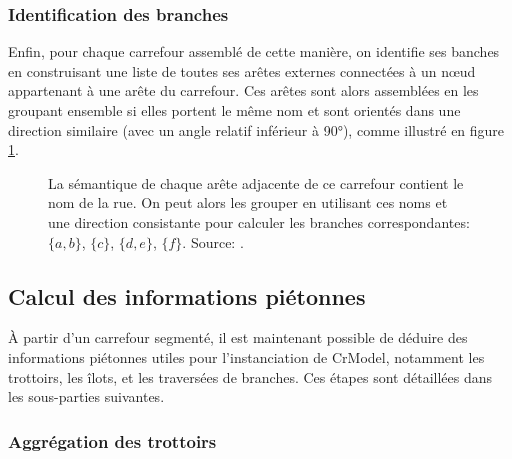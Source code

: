 \subsubsection{Identification des branches}

\newpar{}

Enfin, pour chaque carrefour assemblé de cette manière, on identifie ses banches en construisant une liste de toutes ses arêtes externes connectées à un nœud appartenant à une arête du carrefour. Ces arêtes sont alors assemblées en les groupant ensemble si elles portent le même nom et sont orientés dans une direction similaire (avec un angle relatif inférieur à 90°), comme illustré en figure \ref{fig:modelisation_mergeBranches}.

\begin{figure}
    \centering
    \caption{La sémantique de chaque arête adjacente de ce carrefour contient le nom de la rue. On peut alors les grouper en utilisant ces noms et une direction consistante pour calculer les branches correspondantes: $\{a, b\}$, $\{c\}$, $\{d, e\}$, $\{f\}$. Source: \cite{Favreau2022}.}
    \label{fig:modelisation_mergeBranches}
\end{figure}

\subsection{Calcul des informations piétonnes}

\label{sec:modelisation_calcul_info_pietonnes}

À partir d'un carrefour segmenté, il est maintenant possible de déduire des informations piétonnes utiles pour l'instanciation de CrModel, notamment les trottoirs, les îlots, et les traversées de branches. Ces étapes sont détaillées dans les sous-parties suivantes.

\subsubsection{Aggrégation des trottoirs}

